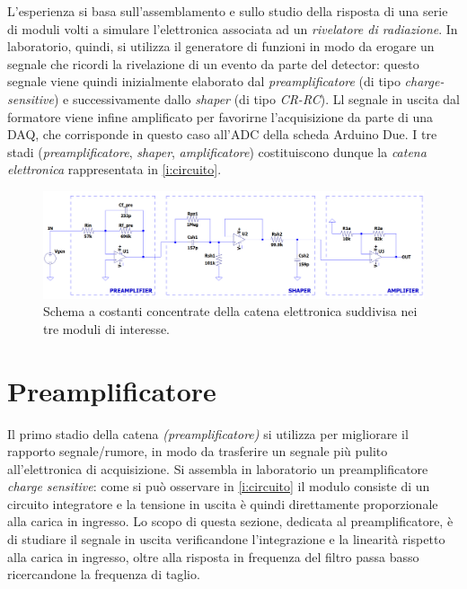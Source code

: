 \documentclass[a4paper,11pt]{article} %
\begin{document}
L'esperienza si basa sull'assemblamento e sullo studio della risposta di una serie di moduli volti a simulare
l'elettronica associata ad un \textit{rivelatore di radiazione}. In laboratorio, quindi, si utilizza il generatore di
funzioni in modo da erogare un segnale che ricordi la rivelazione di un evento da parte del detector: questo segnale
viene quindi inizialmente elaborato dal \textit{preamplificatore} (di tipo \textit{charge-sensitive}) e successivamente
dallo \textit{shaper} (di tipo \textit{CR-RC}). Ll segnale in uscita dal formatore viene infine amplificato per
favorirne l'acquisizione da parte di una DAQ, che corrisponde in questo caso all'ADC della scheda Arduino Due. I tre
stadi (\textit{preamplificatore}, \textit{shaper}, \textit{amplificatore}) costituiscono dunque la \textit{catena
elettronica} rappresentata in \autoref{i:circuito}.
\begin{figure}[H]
	\centering
	\includegraphics[width=0.9\linewidth]{../Simulations/catena_circuito.png}
	\caption{\small Schema a costanti concentrate della catena elettronica suddivisa nei tre moduli di interesse.}
	\label{i:circuito}
\end{figure}


\section{Preamplificatore}\label{s:preamp} 

Il primo stadio della catena \textit{(preamplificatore)} si utilizza per migliorare il rapporto segnale/rumore, in modo
da trasferire un segnale più pulito all'elettronica di acquisizione. Si assembla in laboratorio un preamplificatore
\textit{charge sensitive}: come si può osservare in \autoref{i:circuito} il modulo consiste di un circuito integratore
e la tensione in uscita è quindi direttamente proporzionale alla carica in ingresso. Lo scopo di questa sezione,
dedicata al preamplificatore, è di studiare il segnale in uscita verificandone l'integrazione e la linearità rispetto
alla carica in ingresso, oltre alla risposta in frequenza del filtro passa basso ricercandone la frequenza di taglio.
\end{document}
